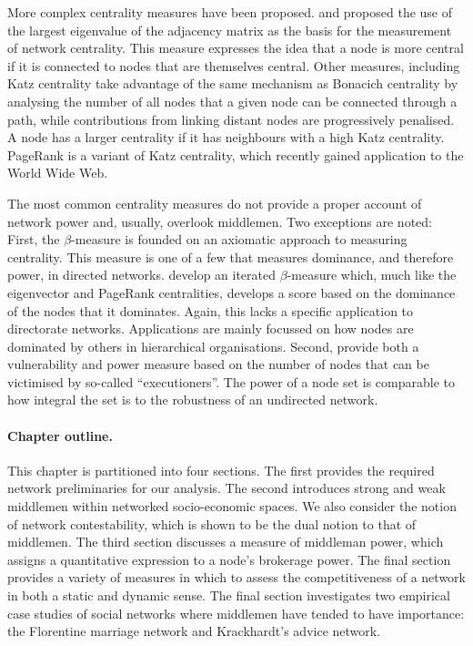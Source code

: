 More complex centrality measures have been proposed. \citet{Bonacich1972,Bonacich1987} and \citet{Bonacich2001} proposed the use of the largest eigenvalue of the adjacency matrix as the basis for the measurement of network centrality. This measure expresses the idea that a node is more central if it is connected to nodes that are themselves central. Other measures, including Katz centrality \citep{Katz1953} take advantage of the same mechanism as Bonacich centrality by analysing the number of all nodes that a given node can be connected through a path, while contributions from linking distant nodes are progressively penalised. A node has a larger centrality if it has neighbours with a high Katz centrality. PageRank \citep{BrinPage1998} is a variant of Katz centrality, which recently gained application to the World Wide Web.

The most common centrality measures do not provide a proper account of network power and, usually, overlook middlemen. Two exceptions are noted: First, the $\beta$-measure \citep{BrinkGilles1996, BrinkGilles2000} is founded on an axiomatic approach to measuring centrality. This measure is one of a few that measures dominance, and therefore power, in directed networks. \citet{BormBrink2002} develop an iterated $\beta$-measure which, much like the eigenvector and PageRank centralities, develops a score based on the dominance of the nodes that it dominates. Again, this lacks a specific application to directorate networks. Applications are mainly focussed on how nodes are dominated by others in hierarchical organisations. Second, \citet{Bozzo2015} provide both a vulnerability and power measure based on the number of nodes that can be victimised by so-called ``executioners''. The power of a node set is comparable to how integral the set is to the robustness of an undirected network.

\paragraph{Chapter outline.}

This chapter is partitioned into four sections. The first provides the required network preliminaries for our analysis. The second introduces strong and weak middlemen within networked socio-economic spaces. We also consider the notion of network contestability, which is shown to be the dual notion to that of middlemen. The third section discusses a measure of middleman power, which assigns a quantitative expression to a node's brokerage power. The final section provides a variety of measures in which to assess the competitiveness of a network in both a static and dynamic sense. The final section investigates two empirical case studies of social networks where middlemen have tended to have importance: the Florentine marriage network and Krackhardt's advice network.

